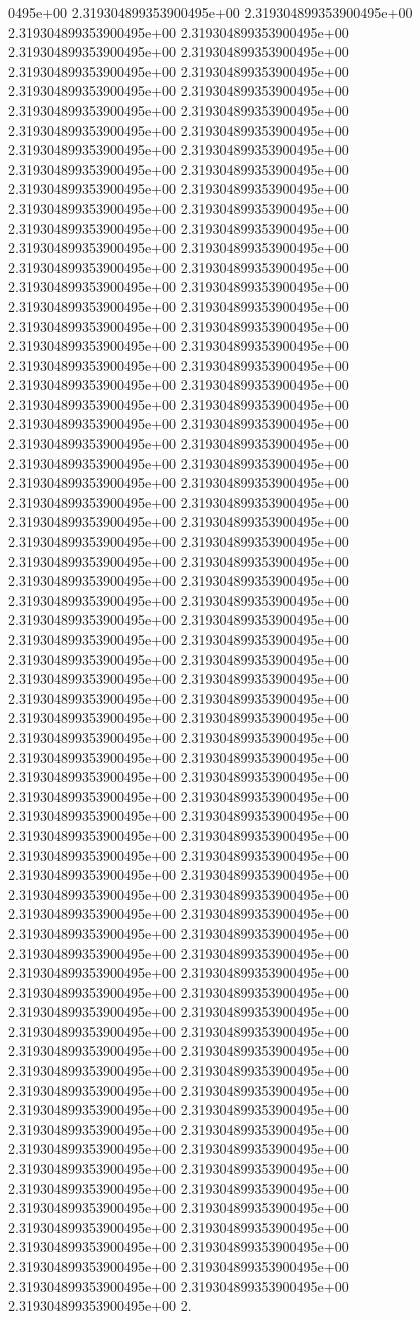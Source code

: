 0495e+00	2.319304899353900495e+00	2.319304899353900495e+00	2.319304899353900495e+00	2.319304899353900495e+00	2.319304899353900495e+00	2.319304899353900495e+00	2.319304899353900495e+00	2.319304899353900495e+00	2.319304899353900495e+00	2.319304899353900495e+00	2.319304899353900495e+00	2.319304899353900495e+00	2.319304899353900495e+00	2.319304899353900495e+00	2.319304899353900495e+00	2.319304899353900495e+00	2.319304899353900495e+00	2.319304899353900495e+00	2.319304899353900495e+00	2.319304899353900495e+00	2.319304899353900495e+00	2.319304899353900495e+00	2.319304899353900495e+00	2.319304899353900495e+00	2.319304899353900495e+00	2.319304899353900495e+00	2.319304899353900495e+00	2.319304899353900495e+00	2.319304899353900495e+00	2.319304899353900495e+00	2.319304899353900495e+00	2.319304899353900495e+00	2.319304899353900495e+00	2.319304899353900495e+00	2.319304899353900495e+00	2.319304899353900495e+00	2.319304899353900495e+00	2.319304899353900495e+00	2.319304899353900495e+00	2.319304899353900495e+00	2.319304899353900495e+00	2.319304899353900495e+00	2.319304899353900495e+00	2.319304899353900495e+00	2.319304899353900495e+00	2.319304899353900495e+00	2.319304899353900495e+00	2.319304899353900495e+00	2.319304899353900495e+00	2.319304899353900495e+00	2.319304899353900495e+00	2.319304899353900495e+00	2.319304899353900495e+00	2.319304899353900495e+00	2.319304899353900495e+00	2.319304899353900495e+00	2.319304899353900495e+00	2.319304899353900495e+00	2.319304899353900495e+00	2.319304899353900495e+00	2.319304899353900495e+00	2.319304899353900495e+00	2.319304899353900495e+00	2.319304899353900495e+00	2.319304899353900495e+00	2.319304899353900495e+00	2.319304899353900495e+00	2.319304899353900495e+00	2.319304899353900495e+00	2.319304899353900495e+00	2.319304899353900495e+00	2.319304899353900495e+00	2.319304899353900495e+00	2.319304899353900495e+00	2.319304899353900495e+00	2.319304899353900495e+00	2.319304899353900495e+00	2.319304899353900495e+00	2.319304899353900495e+00	2.319304899353900495e+00	2.319304899353900495e+00	2.319304899353900495e+00	2.319304899353900495e+00	2.319304899353900495e+00	2.319304899353900495e+00	2.319304899353900495e+00	2.319304899353900495e+00	2.319304899353900495e+00	2.319304899353900495e+00	2.319304899353900495e+00	2.319304899353900495e+00	2.319304899353900495e+00	2.319304899353900495e+00	2.319304899353900495e+00	2.319304899353900495e+00	2.319304899353900495e+00	2.319304899353900495e+00	2.319304899353900495e+00	2.319304899353900495e+00	2.319304899353900495e+00	2.319304899353900495e+00	2.319304899353900495e+00	2.319304899353900495e+00	2.319304899353900495e+00	2.319304899353900495e+00	2.319304899353900495e+00	2.319304899353900495e+00	2.319304899353900495e+00	2.319304899353900495e+00	2.319304899353900495e+00	2.319304899353900495e+00	2.319304899353900495e+00	2.319304899353900495e+00	2.319304899353900495e+00	2.319304899353900495e+00	2.319304899353900495e+00	2.319304899353900495e+00	2.319304899353900495e+00	2.319304899353900495e+00	2.319304899353900495e+00	2.319304899353900495e+00	2.319304899353900495e+00	2.319304899353900495e+00	2.319304899353900495e+00	2.319304899353900495e+00	2.319304899353900495e+00	2.319304899353900495e+00	2.319304899353900495e+00	2.319304899353900495e+00	2.319304899353900495e+00	2.319304899353900495e+00	2.319304899353900495e+00	2.319304899353900495e+00	2.